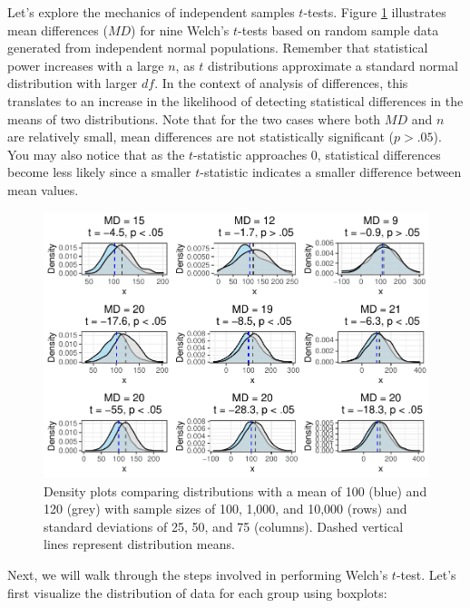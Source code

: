 \documentclass[
]{book}
\begin{document}
Let's explore the mechanics of independent samples \(t\)-tests. Figure \ref{fig:mean-group-diff} illustrates mean differences (\(MD\)) for nine Welch's \(t\)-tests based on random sample data generated from independent normal populations. Remember that statistical power increases with a large \(n\), as \(t\) distributions approximate a standard normal distribution with larger \(df\). In the context of analysis of differences, this translates to an increase in the likelihood of detecting statistical differences in the means of two distributions. Note that for the two cases where both \(MD\) and \(n\) are relatively small, mean differences are not statistically significant (\(p > .05\)). You may also notice that as the \(t\)-statistic approaches 0, statistical differences become less likely since a smaller \(t\)-statistic indicates a smaller difference between mean values.

\begin{figure}

{\centering \includegraphics[width=1\linewidth]{People_Analytics_Lifecycle_files/figure-latex/mean-group-diff-1} 

}

\caption{Density plots comparing distributions with a mean of 100 (blue) and 120 (grey) with sample sizes of 100, 1,000, and 10,000 (rows) and standard deviations of 25, 50, and 75 (columns). Dashed vertical lines represent distribution means.}\label{fig:mean-group-diff}
\end{figure}

Next, we will walk through the steps involved in performing Welch's \(t\)-test. Let's first visualize the distribution of data for each group using boxplots:
\end{document}
